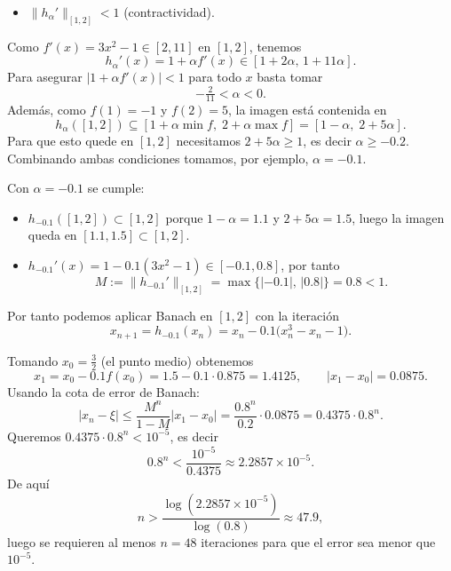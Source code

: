 {\begin{enumerate}[label=(\alph*)]
\begin{itemize}
				\item $\|h_\alpha'\|_{[1,2]}<1$ (contractividad).
			\end{itemize}
			Como $f'(x)=3x^2-1\in[2,11]$ en $[1,2]$, tenemos
			\[
				h_\alpha'(x)=1+\alpha f'(x)\in[1+2\alpha,\,1+11\alpha].
			\]
			Para asegurar $|1+\alpha f'(x)|<1$ para todo $x$ basta tomar
			\[ -\tfrac{2}{11}<\alpha<0. \]
			Además, como $f(1)=-1$ y $f(2)=5$, la imagen está contenida en
			\[
				h_\alpha([1,2])\subseteq[1+\alpha\min f,\;2+\alpha\max f]=[1-\alpha,\;2+5\alpha].
			\]
			Para que esto quede en $[1,2]$ necesitamos $2+5\alpha\ge1$, es decir $\alpha\ge-0.2$.
			Combinando ambas condiciones tomamos, por ejemplo, $\alpha=-0.1$.
			
			Con $\alpha=-0.1$ se cumple:
			\begin{itemize}
				\item $h_{-0.1}([1,2])\subset[1,2]$ porque $1-\alpha=1.1$ y $2+5\alpha=1.5$, luego la imagen queda en $[1.1,1.5]\subset[1,2]$.
				\item $h_{-0.1}'(x)=1-0.1(3x^2-1)\in[-0.1,0.8]$, por tanto
			\[ M:=\|h_{-0.1}'\|_{[1,2]}=\max\{|{-0.1}|,\,|0.8|\}=0.8<1. \]
			\end{itemize}
			Por tanto podemos aplicar Banach en $[1,2]$ con la iteración
			\[ x_{n+1}=h_{-0.1}(x_n)=x_n-0.1\big(x_n^3-x_n-1\big). \]
			
			Tomando $x_0=\tfrac{3}{2}$ (el punto medio) obtenemos
			\[ x_1= x_0-0.1f(x_0)=1.5-0.1\cdot0.875=1.4125,\qquad |x_1-x_0|=0.0875.\]
			Usando la cota de error de Banach:
			\[ |x_n-\xi|\le\frac{M^n}{1-M}|x_1-x_0| = \frac{0.8^n}{0.2}\cdot0.0875 = 0.4375\cdot0.8^n.\]
			Queremos $0.4375\cdot0.8^n<10^{-5}$, es decir
			\[ 0.8^n < \frac{10^{-5}}{0.4375}\approx 2.2857\times10^{-5}.\]
			De aquí
			\[ n>\frac{\log(2.2857\times10^{-5})}{\log(0.8)}\approx 47.9,\]
			luego se requieren al menos $n=48$ iteraciones para que el error sea menor que $10^{-5}$.
	\end{enumerate}
}

